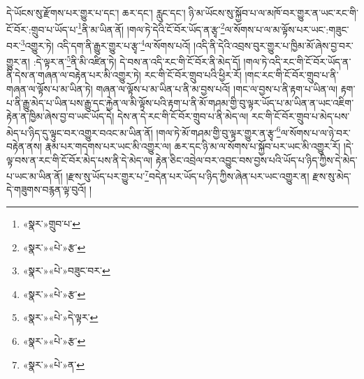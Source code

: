 དེ་ཡོངས་སུ་རྫོགས་པར་གྱུར་པ་དང་། ཆར་དང་། རླུང་དང་། ཉི་མ་ཡོངས་སུ་སྐྱོབ་པ་ལ་མཁོ་བར་གྱུར་ན་ཡང་རང་གི་ངོ་བོར་:གྲུབ་པ་ཡོད་པ་\footnote{«སྣར་»གྲུབ་པ་}ནི་མ་ཡིན་ནོ། །གལ་ཏེ་དེའི་ངོ་བོར་ཡོད་ན་རྩྭ་\footnote{«སྣར་»«པེ་»རྩ་}ལ་སོགས་པ་ལ་མ་ལྟོས་པར་ཡང་:གཟུང་བར་\footnote{«སྣར་»«པེ་»བཟུང་བར་}འགྱུར་ཏེ། འདི་དག་ནི་རྒྱུར་གྱུར་པ་རྩྭ་\footnote{«སྣར་»«པེ་»རྩ་}ལ་སོགས་པའོ། །འདི་ནི་དེའི་འབྲས་བུར་གྱུར་པ་ཁྱིམ་མོ་ཞེས་བྱ་བར་གྱུར་ན། :དེ་ལྟར་ན་\footnote{«སྣར་»«པེ་»དེ་ལྟར་}ནི་མི་འཛིན་ཏེ། དེ་བས་ན་འདི་རང་གི་ངོ་བོར་ནི་མེད་དོ། །གལ་ཏེ་འདི་རང་གི་ངོ་བོར་ཡོད་ན་ནི་དེས་ན་གཞན་ལ་བརྟེན་པར་མི་འགྱུར་ཏེ། རང་གི་ངོ་བོར་གྲུབ་པའི་ཕྱིར་རོ། །གང་རང་གི་ངོ་བོར་གྲུབ་པ་ནི་གཞན་ལ་ལྟོས་པ་མ་ཡིན་ཏེ། གཞན་ལ་ལྟོས་པ་མ་ཡིན་པ་ནི་མ་བྱས་པའོ། །གང་ལ་བྱས་པ་ནི་རྟག་པ་ཡིན་ལ། རྟག་པ་ནི་རྒྱུ་མེད་པ་ཡིན་པས་རྒྱུ་དང་རྐྱེན་ལ་མི་ལྟོས་པའི་རྟག་པ་ནི་མོ་གཤམ་གྱི་བུ་ལྟར་ཡོད་པ་མ་ཡིན་ན་ཡང་འཇིག་རྟེན་ན་ཁྱིམ་ཞེས་བྱ་བ་ཡང་ཡོད་དེ། དེས་ན་དེ་རང་གི་ངོ་བོར་གྲུབ་པ་ནི་མེད་ལ། རང་གི་ངོ་བོར་གྲུབ་པ་མེད་པས་མེད་པ་ཉིད་དུ་ལྟུང་བར་འགྱུར་བའང་མ་ཡིན་ནོ། །གལ་ཏེ་མོ་གཤམ་གྱི་བུ་ལྟར་གྱུར་ན་རྩྭ་\footnote{«སྣར་»«པེ་»རྩ་}ལ་སོགས་པ་ལ་ཉེ་བར་བརྟེན་ནས། རྣམ་པར་གདགས་པར་ཡང་མི་འགྱུར་ལ། ཆར་དང་ཉི་མ་ལ་སོགས་པ་སྐྱོབ་པར་ཡང་མི་འགྱུར་རོ། །དེ་ལྟ་བས་ན་རང་གི་ངོ་བོར་མེད་པས་ནི་དེ་མེད་ལ། རྟེན་ཅིང་འབྲེལ་བར་འབྱུང་བས་བྱས་པའི་ཡོད་པ་ཉིད་ཀྱིས་དེ་མེད་པ་ཡང་མ་ཡིན་ནོ། །རྫས་སུ་ཡོད་པར་གྱུར་པ་\footnote{«སྣར་»«པེ་»ན་}བདེན་པར་ཡོད་པ་ཉིད་ཀྱིས་ཞེན་པར་ཡང་འགྱུར་ན། རྫས་སུ་མེད་དེ་གཟུགས་བརྙན་ལྟ་བུའོ། །
